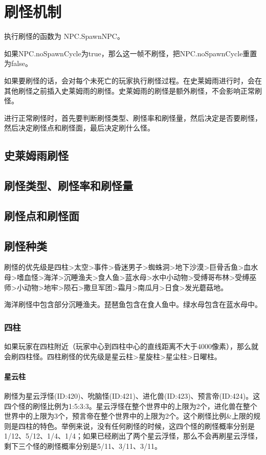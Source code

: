 \chapter{刷怪机制}
执行刷怪的函数为 NPC.SpawnNPC。

如果NPC.noSpawnCycle为true，那么这一帧不刷怪，把NPC.noSpawnCycle重置为false。

如果要刷怪的话，会对每个未死亡的玩家执行刷怪过程。在史莱姆雨进行时，会在其他刷怪之前插入史莱姆雨的刷怪。史莱姆雨的刷怪是额外刷怪，不会影响正常刷怪。

进行正常刷怪时，首先要判断刷怪类型、刷怪率和刷怪量，然后决定是否要刷怪，然后决定刷怪点和刷怪面，最后决定刷什么怪。

\section{史莱姆雨刷怪}

\section{刷怪类型、刷怪率和刷怪量}

\section{刷怪点和刷怪面}

\section{刷怪种类}
刷怪的优先级是四柱>太空>事件>昏迷男子>蜘蛛洞>地下沙漠>巨骨舌鱼>血水母>嗜血怪>海洋>沉睡渔夫>食人鱼>蓝水母>水中小动物>受缚哥布林>受缚巫师>小动物>地牢>陨石>撒旦军团>霜月>南瓜月>日食>发光蘑菇地。

海洋刷怪中包含部分沉睡渔夫。琵琶鱼包含在食人鱼中。绿水母包含在蓝水母中。

\subsection{四柱}
如果玩家在四柱附近（玩家中心到四柱中心的直线距离不大于4000像素），那么就会刷四柱怪。四柱刷怪的优先级是星云柱>星旋柱>星尘柱>日曜柱。

\subsubsection{星云柱}
刷怪为星云浮怪(ID:420)、吮脑怪(ID:421)、进化兽(ID:423)、预言帝(ID:424)。这四个怪的刷怪比例为1:5:3:3。星云浮怪在整个世界中的上限为2个，进化兽在整个世界中的上限为3个，预言帝在整个世界中的上限为2个。这个刷怪比例\&上限的规则是四柱的特色。举例来说，没有任何刷怪的时候，这四个怪的刷怪概率分别是1/12、5/12、1/4、1/4；如果已经刷出了两个星云浮怪，那么不会再刷星云浮怪，剩下三个怪的刷怪概率分别是5/11、3/11、3/11。

